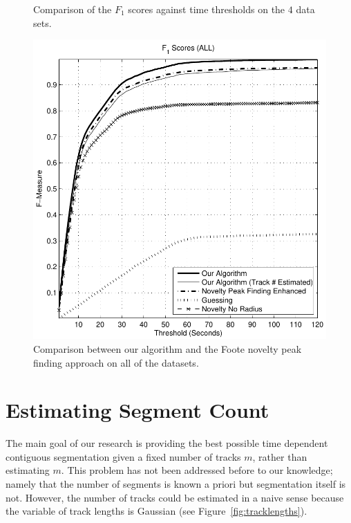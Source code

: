 \documentclass[twocolumn]{article}
\begin{document}
\begin{figure}
\begin{center}
	\end{center}
	
	\caption{Comparison of the $F_1$ scores against time thresholds on the $4$ data sets.}
	\label{fig:fscores_breakdown}
		
\end{figure}


\begin{figure}
	
		\begin{center}
			\includegraphics[scale=0.5]{images/fscores/fall}
		\end{center}

	
	\caption{Comparison between our algorithm and the Foote novelty peak finding approach on all of the datasets.}
	\label{fig:fscores_best}
	
\end{figure}


\section{Estimating Segment Count}\label{sec:trackcount}

The main goal of our research is providing the best possible time dependent contiguous segmentation given a fixed number of tracks $m$, rather than estimating $m$. This problem has not been addressed before to our knowledge; namely that the number of segments is known a priori but segmentation itself is not. However, the number of tracks could be estimated in a naive sense because the variable of track lengths is Gaussian (see Figure~\ref{fig:tracklengths}). 
\end{document}
